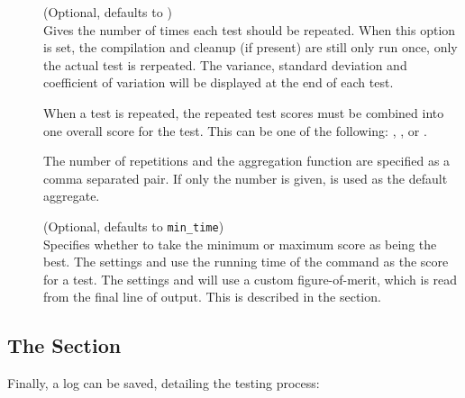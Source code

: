 \documentclass[a4paper, draft]{article}
\begin{document}
\begin{description}

    \item[] (Optional, defaults to ) \\
        Gives the number of times each test should be repeated. When 
        this option is set, the compilation and cleanup (if present) are 
        still only run once, only the actual test is rerpeated. The variance, 
        standard deviation and coefficient of variation will be displayed at 
        the end of each test.
        
        When a test is repeated, the repeated test scores must be combined 
        into one overall score for the test. This can be one of the following: 
        , ,  or 
        . 
        
        The number of repetitions and the aggregation function are specified 
        as a comma separated pair. If only the number is given, 
         is used as the default aggregate.

    \item[] (Optional, defaults to \texttt{min\_time}) \\
        Specifies whether to take the minimum or maximum score as being the 
        best. The settings  and  
        use the running time of the  command as the score 
        for a test. The settings  and  will 
        use a custom figure-of-merit, which is read from the final line of 
        output. This is described in the \emph{} 
        section.

\end{description}


\subsection{The \confsnippet{[output]} Section}
Finally, a log can be saved, detailing the testing process:
\end{document}

